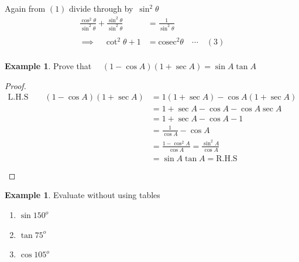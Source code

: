 \documentclass[11pt,a4paper]{article}
\theoremstyle{definition}
\newtheorem{example}[thm]{Example}
\begin{document}
Again from $(1)$ divide through by $\, \sin^2\theta$
\begin{align*}
\frac{\cos^2\theta}{\sin^2\theta} + \frac{\sin^2\theta}{\sin^2\theta} & = \frac{1}{\sin^2\theta}\\\\
\implies \quad  \cot^2 \theta + 1 & = \text{cosec}^2\theta \quad  \cdots\quad  (3)\\
\end{align*}






\begin{example}

Prove that $\quad  (1 - \cos A)(1 + \sec A) = \sin A\tan A$
\end{example}
\begin{proof}

\begin{align*}
\text{L.H.S}\qquad  (1 - \cos A)(1 + \sec A) & = 1( 1 + \sec A) - \cos A ( 1 + \sec A)\\
& = 1 + \sec A - \cos A - \cos A\sec A\\
& = 1 + \sec A - \cos A - 1\\
& = \frac{1}{\cos A} - \cos A\\
& = \frac{1 - \cos^2 A}{\cos A} = \frac{\sin^2A}{\cos A}\\
& = \sin A \tan A = \text{R.H.S}\\\\
\end{align*}
\end{proof}
\begin{example}

Evaluate without using tables
\begin{enumerate}
\item[i.] $\sin 150^o$
\item[ii.] $\tan 75^o$
\item[iii.] $\cos 105^o$\\
\end{enumerate}
\end{example}
\end{document}
